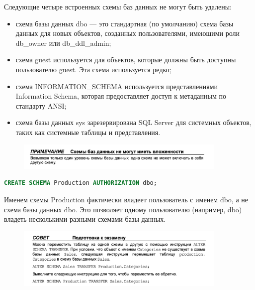 Следующие четыре встроенных схемы баз данных не могут быть удалены: 
\begin{itemize}
	\item схема базы данных dbo — это стандартная (по умолчанию) схема базы данных
	для новых объектов, созданных пользователями, имеющими роли db\_owner или
	db\_ddl\_admin; 
	\item схема guest используется для объектов, которые должны быть доступны пользователю guest. Эта схема используется редко; 
	\item схема INFORMATION\_SCHEMA используется представлениями Information Schema,
	которая предоставляет доступ к метаданным по стандарту ANSI; 
	\item схема базы данных sys зарезервирована SQL Server для системных объектов,
	таких как системные таблицы и представления. 
\end{itemize}

\begin{figure}[h!]
	\begin{center}
		\includegraphics[width=0.9\textwidth]{img/scheme.png}
	\end{center}
	\captionsetup{justification=centering}
\end{figure}

\begin{lstlisting}[label=lst:funcReturn, language=sql]
	CREATE SCHEMA Production AUTHORIZATION dbo;
\end{lstlisting}

Именем схемы Production фактически владеет пользователь с именем dbo, а не схема базы данных dbo. Это позволяет одному пользователю (например, dbo) владеть
несколькими разными схемами базы данных. 


\begin{figure}[h!]
	\begin{center}
		\includegraphics[width=0.9\textwidth]{img/advice13.png}
	\end{center}
	\captionsetup{justification=centering}
\end{figure}

